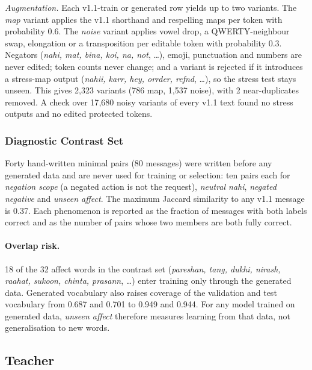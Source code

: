 \documentclass[11pt,a4paper]{article}
\theoremstyle{remark}
\newcommand{\hi}[1]{\textit{#1}}                       %
\begin{document}
\emph{Augmentation.} Each v1.1-train or generated row yields up to two
variants. The \emph{map} variant applies the v1.1 shorthand and respelling maps
per token with probability 0.6. The \emph{noise} variant applies vowel drop, a
QWERTY-neighbour swap, elongation or a transposition per editable token with
probability 0.3. Negators (\hi{nahi, mat, bina, koi, na, not}, \dots), emoji,
punctuation and numbers are never edited; token counts never change; and a
variant is rejected if it introduces a stress-map output (\hi{nahii, karr, hey,
orrder, refnd}, \dots), so the stress test stays unseen. This gives 2{,}323
variants (786 map, 1{,}537 noise), with 2 near-duplicates removed. A check over
17{,}680 noisy variants of every v1.1 text found no stress outputs and no edited
protected tokens.

\subsubsection{Diagnostic Contrast Set}
\label{sec:v12contrast}
Forty hand-written minimal pairs (80 messages) were written before any generated
data and are never used for training or selection: ten pairs each for
\emph{negation scope} (a negated action is not the request), \emph{neutral
nahi}, \emph{negated negative} and \emph{unseen affect}. The maximum Jaccard
similarity to any v1.1 message is 0.37. Each phenomenon is reported as the
fraction of messages with both labels correct and as the number of pairs whose
two members are both fully correct.

\paragraph{Overlap risk.} 18 of the 32 affect words in the contrast set
(\hi{pareshan, tang, dukhi, nirash, raahat, sukoon, chinta, prasann}, \dots)
enter training only through the generated data. Generated vocabulary also
raises coverage of the validation and test vocabulary from 0.687 and 0.701 to
0.949 and 0.944. For any model trained on generated data, \emph{unseen affect}
therefore measures learning from that data, not generalisation to new words.

\subsection{Teacher}
\label{sec:v12teacher}
\end{document}
